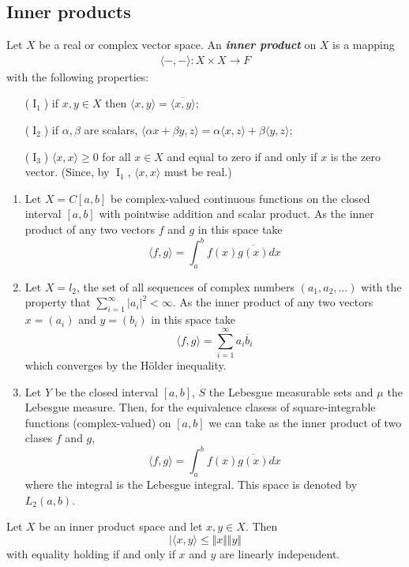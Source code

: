 \documentclass{article}
\theoremstyle{definition}
\numberwithin{equation}{section}
\begin{document}
	\subsection{Inner products}
	Let $X$ be a real or complex vector space.
	An \textbf{\textit{inner product}} on $X$ is a mapping
	\begin{align*}
		\langle-,-\rangle:X\times X\to F
	\end{align*}
	with the following properties:
	\begin{enumerate}
		\item[($\operatorname{I}_1$)] if $x,y\in X$ then $\langle x,y\rangle=\overline{\langle x,y\rangle}$;
		\item[($\operatorname{I}_2$)] if $\alpha,\beta$ are scalars, $\langle\alpha x+\beta y,z\rangle =\alpha\langle x,z\rangle+\beta\langle y,z\rangle$;
		\item[($\operatorname{I}_3$)] $\langle x,x\rangle\geq0$ for all $x\in X$ and equal to zero if and only if $x$ is the zero vector. (Since, by $\operatorname{I}_1$, $\langle x,x\rangle$ must be real.)
	\end{enumerate}
	\begin{examples}\leavevmode
		\begin{enumerate}
			\item Let $X=C[a,b]$ be complex-valued continuous functions on the closed interval $[a,b]$ with pointwise addition and scalar product. As the inner product of any two vectors $f$ and $g$ in this space take
		\[\langle f,g\rangle=\int_a^bf(x)\overline{g(x)}dx\]
		\item Let $X=l_2$, the set of all sequences of complex numbers $(a_1,a_2,\ldots)$ with the property that $\sum_{i=1}^\infty|a_i|^2<\infty$. As the inner product of any two vectors $x=(a_i)$ and $y=(b_i)$ in this space take
		\[\langle f,g\rangle=\sum_{i=1}^\infty a_i\overline{b}_i\]
		which converges by the Hölder inequality.
		
		\item Let $Y$ be the closed interval $[a,b]$, $S$ the Lebesgue measurable sets and $\mu$ the Lebesgue measure. Then, for the equivalence clasess of square-integrable functions (complex-valued) on $[a,b]$ we can take as the inner product of two clases $f$ and $g$,
				\[\langle f,g\rangle=\int_a^bf(x)\overline{g(x)}dx\]
		where the integral is the Lebesgue integral. This space is denoted by $L_2(a,b)$.
		\end{enumerate}
		\end{examples}
		\begin{thm}
			Let $X$ be an inner product space and let $x,y\in X$. Then
			\[|\langle x,y\rangle\leq\Vert x\Vert\Vert y\Vert\]
			with equality holding if and only if $x$ and $y$ are linearly independent.
		\end{thm}
\end{document}
